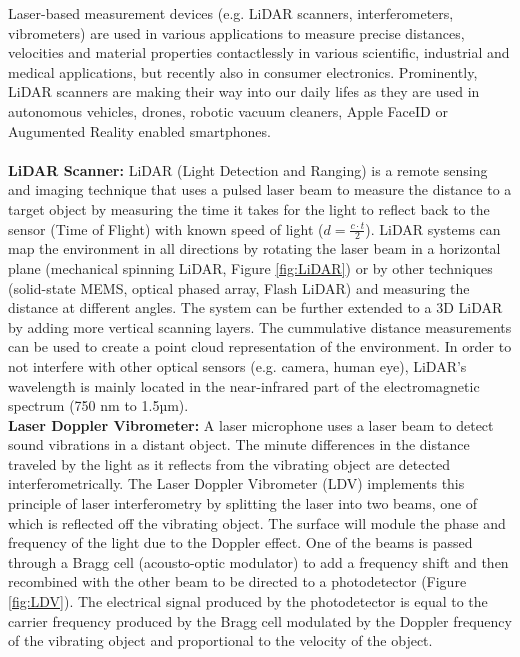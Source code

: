 \documentclass[sigconf, nonacm]{acmart}
\begin{document}
Laser-based measurement devices (e.g. LiDAR scanners, interferometers, vibrometers) are used in various applications to measure precise distances, velocities and material properties contactlessly in various scientific, industrial and medical applications, but recently also in consumer electronics.
Prominently, LiDAR scanners are making their way into our daily lifes as they are used in autonomous vehicles, drones, robotic vacuum cleaners, Apple FaceID or Augumented Reality enabled smartphones.
\\~\\
\textbf{LiDAR Scanner:} LiDAR (Light Detection and Ranging) is a remote sensing and imaging technique that uses a pulsed laser beam to measure the distance to a target object by measuring the time it takes for the light to reflect back to the sensor (Time of Flight) with known speed of light ($d=\frac{c\cdot t}{2}$).
LiDAR systems can map the environment in all directions by rotating the laser beam in a horizontal plane (mechanical spinning LiDAR, Figure \ref{fig:LiDAR}) or by other techniques (solid-state MEMS, optical phased array, Flash LiDAR) and measuring the distance at different angles. The system can be further extended to a 3D LiDAR by adding more vertical scanning layers.
The cummulative distance measurements can be used to create a point cloud representation of the environment.
In order to not interfere with other optical sensors (e.g. camera, human eye), LiDAR's wavelength is mainly located in the near-infrared part of the electromagnetic spectrum (750 nm to 1.5µm).
\\[6pt]
\textbf{Laser Doppler Vibrometer:} A laser microphone uses a laser beam to detect sound vibrations in a distant object. The minute differences in the distance traveled by the light as it reflects from the vibrating object are detected interferometrically. The Laser Doppler Vibrometer (LDV) implements this principle of laser interferometry by splitting the laser into two beams, one of which is reflected off the vibrating object. The surface will module the phase and frequency of the light due to the Doppler effect. One of the beams is passed through a Bragg cell (acousto-optic modulator) to add a frequency shift and then recombined with the other beam to be directed to a photodetector (Figure \ref{fig:LDV}). The electrical signal produced by the photodetector is equal to the carrier frequency produced by the Bragg cell modulated by the Doppler frequency of the vibrating object and proportional to the velocity of the object.
\end{document}
